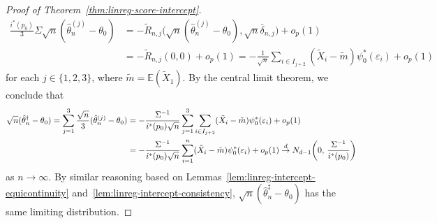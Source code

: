 \documentclass[a4paper]{article}
\newcommand{\E}{\mathbb{E}}
\newcommand{\cvd}{\overset{d}{\to}}
\theoremstyle{definition}
\begin{document}
\begin{proof}[Proof of Theorem~\ref{thm:linreg-score-intercept}]
\begin{align*}
\frac{i^*(p_0)}{3}\Sigma\sqrt{n}(\hat{\theta}_n^{(j)} - \theta_0) &= -\tilde{R}_{n,j}\bigl(\sqrt{n}(\hat{\theta}_n^{(j)} - \theta_0), \sqrt{n}\bar{\delta}_{n,j}\bigr) + o_p(1) \\
&= -\tilde{R}_{n,j}(0,0) + o_p(1) = -\frac{1}{\sqrt{n}}\sum_{i \in I_{j+2}} (\tilde{X}_i - \tilde{m})\psi_0^*(\varepsilon_i) + o_p(1)
\end{align*}
for each $j \in \{1,2,3\}$, where $\tilde{m} = \E(\tilde{X}_1)$. By the central limit theorem, we conclude that
\begin{align}
\sqrt{n}(\hat{\theta}_n^\dagger - \theta_0) = \sum_{j=1}^3 \frac{\sqrt{n}}{3}(\hat{\theta}_n^{(j)} - \theta_0) &= -\frac{\Sigma^{-1}}{i^*(p_0)\sqrt{n}}\sum_{j=1}^3 \sum_{i \in I_{j+2}} (\tilde{X}_i - \tilde{m})\psi_0^*(\varepsilon_i) + o_p(1) \notag \\
\label{eq:theta-asymp-linear}
&= -\frac{\Sigma^{-1}}{i^*(p_0)\sqrt{n}}\sum_{i=1}^n (\tilde{X}_i - \tilde{m})\psi_0^*(\varepsilon_i) + o_p(1) \cvd N_{d-1}\biggl(0,\,\frac{\Sigma^{-1}}{i^*(p_0)}\biggr)
\end{align}
as $n \to \infty$. By similar reasoning based on Lemmas~\ref{lem:linreg-intercept-equicontinuity} and~\ref{lem:linreg-intercept-consistency}, $\sqrt{n}(\hat{\theta}_n^\ddagger - \theta_0)$ has the same limiting distribution.


\end{proof}
\end{document}
